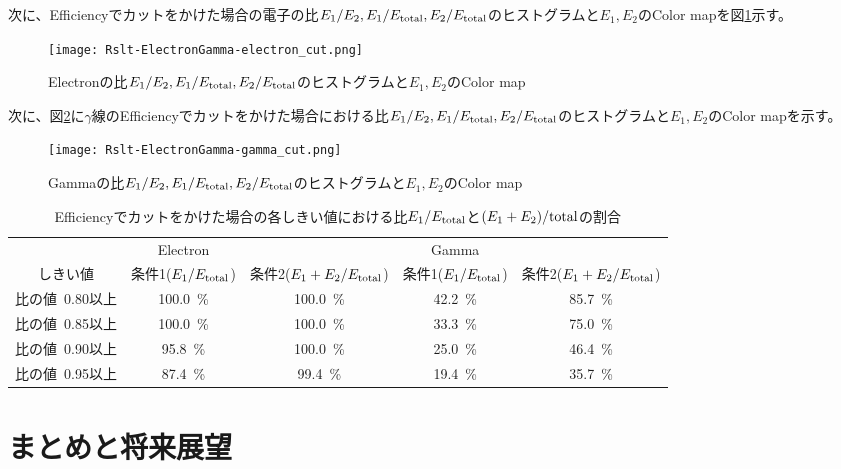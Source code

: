 \documentclass[a4paper,10pt]{jreport}
\begin{document}
次に、Efficiencyでカットをかけた場合の電子の比$E_1/E_2,E_1/E_{\rm{total}},E_2/E_{\rm{total}}$のヒストグラムと$E_1,E_2$のColor mapを図\ref{Rslt-ElectronGamma-electron_cut}示す。

\begin{figure}[H]
	\center
	\texttt{[image: Rslt-ElectronGamma-electron\_cut.png]}
	\caption{Electronの比$E_1/E_2,E_1/E_{\rm{total}},E_2/E_{\rm{total}}$のヒストグラムと$E_1,E_2$のColor map}
	\label{Rslt-ElectronGamma-electron_cut}
\end{figure}

次に、図\ref{Rslt-ElectronGamma-gamma_cut}に$\gamma$線のEfficiencyでカットをかけた場合における比$E_1/E_2,E_1/E_{\rm{total}},E_2/E_{\rm{total}}$のヒストグラムと$E_1,E_2$のColor mapを示す。

\begin{figure}[H]
	\center
	\texttt{[image: Rslt-ElectronGamma-gamma\_cut.png]}
	\caption{Gammaの比$E_1/E_2,E_1/E_{\rm{total}},E_2/E_{\rm{total}}$のヒストグラムと$E_1,E_2$のColor map}
	\label{Rslt-ElectronGamma-gamma_cut}
\end{figure}



\begin{table}[H]
	\center
	\caption{Efficiencyでカットをかけた場合の各しきい値における比$E_1/E_{\rm{total}}$と$(E_1+E_2)/{\rm{total}}$の割合} \label{Tab-82SeDoubleDecayTable}
	\begin{tabular}{c|cc|cc}
		\hline
		 & Electron &  & Gamma &  \\
		しきい値 & 条件1($E_1/E_{\rm{total}}$) & 条件2($E_1+E_2/E_{\rm{total}}$) & 条件1($E_1/E_{\rm{total}}$) & 条件2($E_1+E_2/E_{\rm{total}}$)\\
		\hline
		比の値\ 0.80以上 & \SI{100.0}{\%} & \SI{100.0}{\%} & \SI{42.2}{\%} & \SI{85.7}{\%} \\
		比の値\ 0.85以上 & \SI{100.0}{\%} & \SI{100.0}{\%} & \SI{33.3}{\%} & \SI{75.0}{\%} \\
		比の値\ 0.90以上 & \SI{95.8}{\%}   & \SI{100.0}{\%} & \SI{25.0}{\%} & \SI{46.4}{\%} \\
		比の値\ 0.95以上 & \SI{87.4}{\%}   & \SI{99.4}{\%}   & \SI{19.4}{\%} & \SI{35.7}{\%} \\
		\hline
	\end{tabular}
\end{table}



\chapter*{まとめと将来展望}
\end{document}
